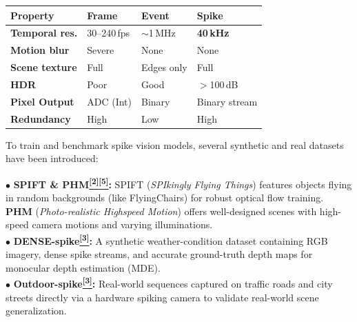 \documentclass[final]{beamer}
\newcommand{\paper}[1]{\hyperlink{ref:#1}{\textcolor{TealAccent}{\textsuperscript{\textbf{[#1]}}}}}
\newlength{\CW}\setlength{\CW}{38.0cm}    %
\newlength{\FW}\setlength{\FW}{119.0cm}   %
\begin{document}
\begin{frame}[t]{}
\begin{columns}[T,totalwidth=\FW]
\begin{column}{\CW}
\vspace{0.25cm}
\begin{tcolorbox}[pbox=MidBlue,
  title={Sensor Comparison: Frame / Event / Spike Cameras}]
\normalsize
\begin{center}
\setlength{\tabcolsep}{5pt}
\renewcommand{\arraystretch}{1.4}
\begin{tabularx}{0.97\linewidth}{>{\bfseries\normalsize}l X X X}
\toprule
\rowcolor{MidBlue!12}
Property & Frame & Event & \cellcolor{TealAccent!18}Spike \\
\midrule
Temporal res. & 30–240\,fps & $\sim$1\,MHz & \cellcolor{TealAccent!10}\textbf{40\,kHz}\\
Motion blur & Severe & None & \cellcolor{TealAccent!10}None\\
Scene texture & Full & Edges only & \cellcolor{TealAccent!10}Full\\
HDR & Poor & Good & \cellcolor{TealAccent!10}$>$100\,dB\\
\rowcolor{MidBlue!12}
Pixel Output & ADC (Int) & Binary & \cellcolor{TealAccent!10}Binary stream\\
Redundancy & High & Low & \cellcolor{TealAccent!10}High\\
\bottomrule
\end{tabularx}
\end{center}
\end{tcolorbox}

\vspace{0.12cm}

\begin{tcolorbox}[pbox=TheoryCol,
  title={Key Evaluation Datasets}]
\normalsize
To train and benchmark spike vision models, several synthetic and real datasets have been introduced:

\medskip
$\bullet$ \textbf{SPIFT \& PHM\paper{2}\paper{5}:} SPIFT (\emph{SPIkingly Flying Things}) features objects flying in random backgrounds (like FlyingChairs) for robust optical flow training. \textbf{PHM} (\emph{Photo-realistic Highspeed Motion}) offers well-designed scenes with high-speed camera motions and varying illuminations.\\
$\bullet$ \textbf{DENSE-spike\paper{3}:} A synthetic weather-condition dataset containing RGB imagery, dense spike streams, and accurate ground-truth depth maps for monocular depth estimation (MDE).\\
$\bullet$ \textbf{Outdoor-spike\paper{3}:} Real-world sequences captured on traffic roads and city streets directly via a hardware spiking camera to validate real-world scene generalization.
\end{tcolorbox}


\end{column}
\end{columns}
\end{frame}
\end{document}
